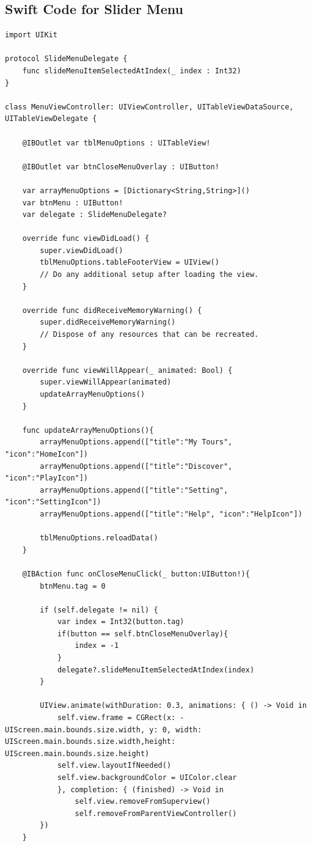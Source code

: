 \documentclass[letterpaper, 10pt,titlepage]{article}
\begin{document}
\subsection{Swift Code for Slider Menu}
\begin{verbatim}
import UIKit

protocol SlideMenuDelegate {
    func slideMenuItemSelectedAtIndex(_ index : Int32)
}

class MenuViewController: UIViewController, UITableViewDataSource, UITableViewDelegate {

    @IBOutlet var tblMenuOptions : UITableView!
    
    @IBOutlet var btnCloseMenuOverlay : UIButton!

    var arrayMenuOptions = [Dictionary<String,String>]()
    var btnMenu : UIButton!
    var delegate : SlideMenuDelegate?
    
    override func viewDidLoad() {
        super.viewDidLoad()
        tblMenuOptions.tableFooterView = UIView()
        // Do any additional setup after loading the view.
    }
    
    override func didReceiveMemoryWarning() {
        super.didReceiveMemoryWarning()
        // Dispose of any resources that can be recreated.
    }
    
    override func viewWillAppear(_ animated: Bool) {
        super.viewWillAppear(animated)
        updateArrayMenuOptions()
    }
    
    func updateArrayMenuOptions(){
        arrayMenuOptions.append(["title":"My Tours", "icon":"HomeIcon"])
        arrayMenuOptions.append(["title":"Discover", "icon":"PlayIcon"])
        arrayMenuOptions.append(["title":"Setting", "icon":"SettingIcon"])
        arrayMenuOptions.append(["title":"Help", "icon":"HelpIcon"])
        
        tblMenuOptions.reloadData()
    }
    
    @IBAction func onCloseMenuClick(_ button:UIButton!){
        btnMenu.tag = 0
        
        if (self.delegate != nil) {
            var index = Int32(button.tag)
            if(button == self.btnCloseMenuOverlay){
                index = -1
            }
            delegate?.slideMenuItemSelectedAtIndex(index)
        }
        
        UIView.animate(withDuration: 0.3, animations: { () -> Void in
            self.view.frame = CGRect(x: -UIScreen.main.bounds.size.width, y: 0, width: UIScreen.main.bounds.size.width,height: UIScreen.main.bounds.size.height)
            self.view.layoutIfNeeded()
            self.view.backgroundColor = UIColor.clear
            }, completion: { (finished) -> Void in
                self.view.removeFromSuperview()
                self.removeFromParentViewController()
        })
    }
    

\end{verbatim}
\end{document}
